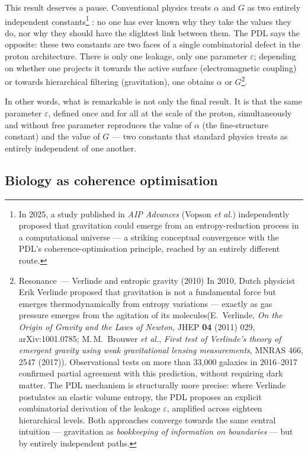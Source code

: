 \documentclass[12pt, a4paper, openright]{book}
\begin{document}
This result deserves a pause. Conventional physics treats $\alpha$ and $G$ as two entirely independent constants\footnote{In 2025, a study published in \textit{AIP Advances} (Vopson \textit{et al.})
independently proposed that gravitation could emerge from an entropy-reduction process
in a computational universe --- a striking conceptual convergence with the PDL's
coherence-optimisation principle, reached by an entirely different route.}
: no one has ever known why they take the values they do, nor why they should have the slightest link between them. The PDL says the opposite: these two constants are two faces of a single combinatorial defect in the proton architecture. There is only one leakage, only one parameter $\varepsilon$; depending on whether one projects it towards the active surface (electromagnetic coupling) or towards hierarchical filtering (gravitation), one obtains $\alpha$ or $G$\footnote{Resonance~--- Verlinde and entropic gravity (2010) In 2010, Dutch physicist Erik Verlinde proposed that gravitation is not a fundamental force but emerges thermodynamically from entropy variations --- exactly as gas pressure emerges from the agitation of its molecules(E.\ Verlinde, \textit{On the Origin of Gravity and the Laws of Newton}, JHEP \textbf{04} (2011) 029, arXiv:1001.0785; M.\,M.\ Brouwer \textit{et al.}, \textit{First test of Verlinde's theory of emergent gravity using weak gravitational lensing measurements}, MNRAS 466, 2547 (2017)). Observational tests on more than 33{,}000 galaxies in 2016--2017 confirmed partial agreement with this prediction, without requiring dark matter. The PDL mechanism is structurally more precise: where Verlinde postulates an elastic volume entropy, the PDL proposes an explicit combinatorial derivation of the leakage $\varepsilon$, amplified across eighteen hierarchical levels. Both approaches converge towards the same central intuition --- gravitation as \emph{bookkeeping of information on boundaries} --- but by entirely independent paths.}.

\medskip

In other words, what is remarkable is not only the final result. It is that the same parameter $\varepsilon$, defined once and for all at the scale of the proton, simultaneously and without free parameter reproduces the value of $\alpha$ (the fine-structure constant) and the value of $G$ — two constants that standard physics treats as entirely independent of one another.

\subsection*{Biology as coherence optimisation}
\end{document}
